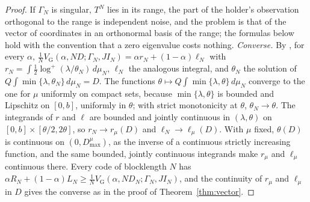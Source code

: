 \documentclass[11pt,onecolumn]{IEEEtran}
\newcommand{\VG}{V_{\mathrm G}}
\begin{document}
\begin{proof}
If $\Gamma_N$ is singular, $T^N$ lies in its range, the part of the
holder's observation orthogonal to the range is independent noise, and
the problem is that of the vector of coordinates in an orthonormal
basis of the range; the formulas below hold with the convention that a
zero eigenvalue costs nothing. \emph{Converse.} By
\cite[Lemma~24]{part3}, for every $\alpha$,
$\tfrac1N\VG(\alpha,ND;\Gamma_N,JI_N)=\alpha r_N+(1-\alpha)\ell_N$ with
$r_N=\int\tfrac12\log^+(\lambda/\theta_N)\,d\mu_N$, $\ell_N$ the
analogous integral, and $\theta_N$ the solution of
$Q\int\min\{\lambda,\theta_N\}\,d\mu_N=D$. The functions
$\theta\mapsto Q\int\min\{\lambda,\theta\}\,d\mu_N$ converge to the one
for $\mu$ uniformly on compact sets, because $\min\{\lambda,\theta\}$ is
bounded and Lipschitz on $[0,b]$, uniformly in $\theta$; with strict
monotonicity at $\theta$, $\theta_N\to\theta$. The integrands of $r$
and $\ell$ are bounded and jointly continuous in $(\lambda,\theta)$ on
$[0,b]\times[\theta/2,2\theta]$, so $r_N\to r_\mu(D)$ and
$\ell_N\to\ell_\mu(D)$. With $\mu$ fixed, $\theta(D)$ is continuous on
$(0,D_{\max}^\mu)$, as the inverse of a continuous strictly increasing
function, and the same bounded, jointly continuous integrands make
$r_\mu$ and $\ell_\mu$ continuous there. Every code of blocklength $N$ has
$\alpha R_N+(1-\alpha)L_N\ge\tfrac1N\VG(\alpha,ND_N;\Gamma_N,JI_N)$, and the
continuity of $r_\mu$ and $\ell_\mu$ in $D$ gives the converse as in the
proof of Theorem~\ref{thm:vector}.


\end{proof}
\end{document}
